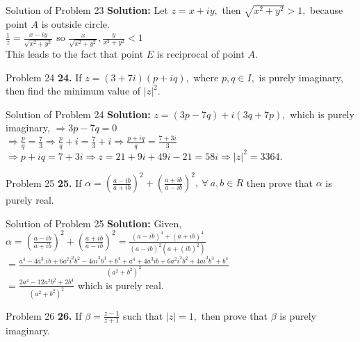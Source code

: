 \documentclass[aspectratio=169,8pt]{beamer}
\begin{document}
\begin{frame}{Solution of Problem 23}
  \textbf{Solution:} Let $z = x + iy,$ then $\sqrt{x^2 + y^2} > 1,$ because point $A$ is outside circle.\\
  \vspace*{0.2cm}
  $\frac{1}{z} = \frac{x - iy}{\sqrt{x^2 + y^2}}$ so $\frac{x}{\sqrt{x^2 + y^2}}, \frac{y}{x^2 + y^2}< 1$\\
  \vspace*{0.2cm}
  This leads to the fact that point $E$ is reciprocal of point $A.$
\end{frame}
\begin{frame}{Problem 24}
  \textbf{24.} If $z = (3 + 7i)(p + iq),$ where $p, q\in I,$ is purely imaginary, then find the minimum value of $|z|^2.$
\end{frame}
\begin{frame}{Solution of Problem 24}
  \textbf{Solution:} $z = (3p - 7q) + i(3q + 7p),$ which is purely imaginary, $\Rightarrow 3p - 7q = 0$\\
  \vspace*{0.2cm}
  $\Rightarrow \frac{p}{q} = \frac{7}{3} \Rightarrow \frac{p}{q} + i = \frac{7}{3} + i \Rightarrow \frac{p + iq}{q} = \frac{7 + 3i}{3}$\\
  \vspace*{0.2cm}
  $\Rightarrow p+ iq = 7 + 3i \Rightarrow z = 21 + 9i + 49i - 21 = 58i \Rightarrow |z|^2 = 3364.$
\end{frame}
\begin{frame}{Problem 25}
  \textbf{25.} If $\alpha = \left(\frac{a - ib}{a + ib}\right)^2 + \left(\frac{a + ib}{a - ib}\right)^2,~\forall~a,b \in R$ then prove
  that $\alpha$ is purely real.
\end{frame}
\begin{frame}{Solution of Problem 25}
  \textbf{Solution:} Given, $\alpha = \left(\frac{a - ib}{a + ib}\right)^2 + \left(\frac{a + ib}{a - ib}\right)^2 = \frac{(a - ib)^4 + (a + ib)^4}{(a - ib)^2(a + (ib)^2)}$\\
  \vspace*{0.2cm}
  $= \frac{a^4 - 4a^3.ib + 6a^2i^2b^2 - 4ai^3b^3 + b^4 + a^4 + 4a^3ib + 6a^2i^2b^2 + 4ai^3b^3 + b^4}{(a^2 + b^2)^2}$\\
  \vspace*{0.2cm}
  $= \frac{2a^4 - 12a^2b^2 + 2b^4}{(a^2 + b^2)^2}$ which is purely real.
\end{frame}
\begin{frame}{Problem 26}
  \textbf{26.} If $\beta = \frac{z - 1}{z + 1}$ such that $|z| = 1,$ then prove that $\beta$ is purely imaginary.
\end{frame}
\end{document}
